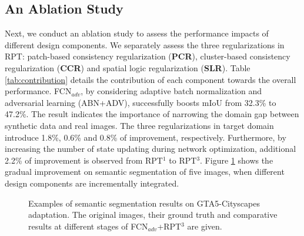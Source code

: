 \documentclass[10pt,twocolumn,letterpaper]{article}
\begin{document}
\subsection{An Ablation Study}
Next, we conduct an ablation study to assess the performance impacts of different design components. We separately assess the three regularizations in RPT: patch-based consistency regularization (\textbf{PCR}), cluster-based consistency regularization (\textbf{CCR}) and spatial logic regularization (\textbf{SLR}). Table \ref{tab:contribution} details the contribution of each component towards the overall performance. FCN$_{adv}$, by considering adaptive batch normalization and adversarial learning (ABN+ADV), successfully boosts mIoU from 32.3\% to 47.2\%. The result indicates the importance of narrowing the domain gap between synthetic data and real images. The three regularizations in target domain introduce 1.8\%, 0.6\% and 0.8\% of improvement, respectively. Furthermore, by increasing the number of state updating during network optimization, additional 2.2\% of improvement is observed from RPT$^{1}$ to RPT$^{3}$. Figure \ref{fig:comparison} shows the gradual improvement on semantic segmentation of five images, when different design components are incrementally integrated.

\begin{figure}[!tb]
   \caption{\small Examples of semantic segmentation results on GTA5-Cityscapes adaptation. The original images, their ground truth and comparative results at different stages of FCN$_{adv}$+RPT$^{3}$ are given.}
   \label{fig:comparison}
   \vspace{-0.15in}
\end{figure}
\end{document}
